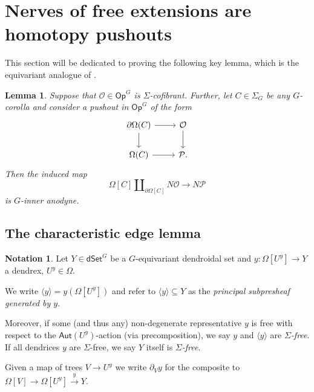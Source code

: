 \documentclass[a4paper,10pt]{article}%
\numberwithin{equation}{section}
\numberwithin{figure}{section}
\newtheorem{lemma}[equation]{Lemma}%
\theoremstyle{definition} %
\newtheorem{notation}[equation]{Notation}%
\newcommand{\1}{\ensuremath{\mathbbm 1}}%
\begin{document}
 
\section{Nerves of free extensions are homotopy pushouts}
\label{KEYRES SEC}

This section will be dedicated to proving the following key lemma,
which is the equivariant analogue of
\cite[Prop. 3.2]{CM13b}.


\begin{lemma}\label{KEYPR LEM}
	Suppose that $\mathcal{O} \in \mathsf{Op}^{G}$
	is $\Sigma$-cofibrant.
	Further, let $C \in \Sigma_G$ be any $G$-corolla and consider 
	a pushout in $\mathsf{Op}^{G}$ of the form
	\begin{equation}\label{PUSHOUTPROP EQ}
	\begin{tikzcd}
	\partial \Omega(C) \ar{r} \ar{d} & \mathcal{O} \ar{d}
	\\
	\Omega(C) \ar{r} & \mathcal{P}.
	\end{tikzcd}
	\end{equation}
	Then the induced map
	\begin{equation}\label{ANODYNE MAP}
	\Omega[C] \amalg_{\partial \Omega[C]} N\mathcal{O} \to N\mathcal{P}
	\end{equation}
	is $G$-inner anodyne.
\end{lemma}




\subsection{The characteristic edge lemma}



\begin{notation}
	Let $Y \in \mathsf{dSet}^G$ be a $G$-equivariant dendroidal set and 
	$y \colon \Omega[U^y] \to Y$
	a dendrex, $U^y \in \Omega$.
	
	We write $\langle y \rangle = y\left(  \Omega[U^y] \right)$
	and refer to
	$\langle y \rangle \subseteq Y$
	as the \emph{principal subpresheaf generated by $y$}.
	
	Moreover, if some (and thus any)
	non-degenerate representative $y$ is free 
	with respect to the $\mathsf{Aut}(U^y)$-action (via precomposition),
	we say $y$ and $\langle y \rangle$ are \emph{$\Sigma$-free}.
	If all dendrices $y$ are $\Sigma$-free, we say $Y$ itself is \textit{$\Sigma$-free}.
	
	Given a map of trees $V \to U^y$ we write $\partial_V y$ for the composite to $\Omega[V] \to \Omega[U^y] \xrightarrow{y} Y$.
\end{notation}
\end{document}
